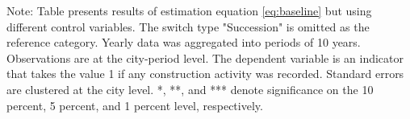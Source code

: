 \begin{table}[htbp]
\begin{tabular}{lcccc}
      
   \end{tabular}
   
   \par \raggedright 
   Note: Table presents results of estimation equation \eqref{eq:baseline} but using different control variables. The switch type  "Succession" is omitted as the reference category. Yearly data was aggregated into periods of 10 years. Observations are at the city-period level. The dependent variable is an  indicator that takes the value 1 if any construction activity was recorded.  Standard errors are clustered at the city level. *, **, and *** denote significance on the 10 percent, 5 percent, and 1 percent  level, respectively.
\end{table}
